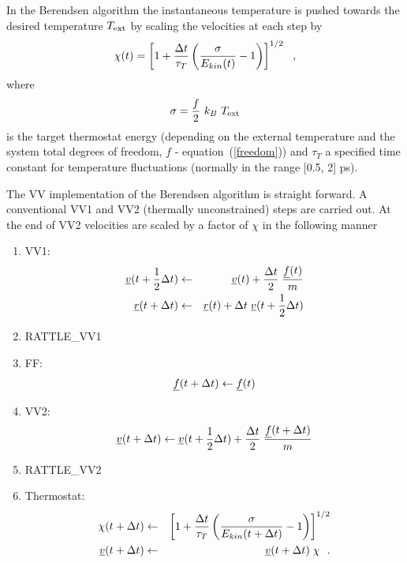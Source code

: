 In the Berendsen algorithm the instantaneous temperature is pushed
towards the desired temperature $T_{\rm ext}$ by scaling the
velocities at each step by
\begin{equation}
\chi (t) = \left[ 1 + {\Delta t \over \tau_{T}} \left(
{\sigma \over E_{kin}(t)} - 1 \right) \right]^{1/2}~~,
\end{equation}
where
\begin{equation}
\sigma = \frac{f}{2}~k_{B}~T_{\rm ext} \label{sigma}
\end{equation}
is the target thermostat energy (depending on the external
temperature and the system total degrees of freedom, $f$ -
equation~(\ref{freedom})) and $\tau_{T}$ a specified time constant
for temperature fluctuations (normally in the range [0.5, 2] ps).

The VV implementation of the Berendsen algorithm is straight forward.
A conventional VV1 and VV2 (thermally unconstrained) steps are
carried out.  At the end of VV2 velocities are scaled by a factor
of $\chi$ in the following manner
\begin{enumerate}
\item VV1:
\begin{eqnarray}
\mbox{$\underline{v}$}(t + {1 \over 2} \Delta t) &\leftarrow& \mbox{$\underline{v}$}(t) +
{\Delta t \over 2} \; {\mbox{$\underline{f}$}(t) \over m} \nonumber \\
\mbox{$\underline{r}$}(t + \Delta t) &\leftarrow& \mbox{$\underline{r}$}(t) + \Delta t \;
\mbox{$\underline{v}$}(t + {1 \over 2} \Delta t)
\end{eqnarray}
\item RATTLE\_VV1
\item FF:
\begin{equation}
\mbox{$\underline{f}$}(t + \Delta t) \leftarrow \mbox{$\underline{f}$}(t)
\end{equation}
\item VV2:
\begin{equation}
\mbox{$\underline{v}$}(t + \Delta t) \leftarrow \mbox{$\underline{v}$}(t + {1 \over 2} \Delta t) +
{\Delta t \over 2} \; {\mbox{$\underline{f}$}(t + \Delta t) \over m}
\end{equation}
\item RATTLE\_VV2
\item Thermostat:
\begin{eqnarray}
\chi (t + \Delta t) &\leftarrow& \left[ 1 + {\Delta t \over \tau_{T}}
\left( {\sigma \over E_{kin}(t + \Delta t)} - 1 \right) \right]^{1/2} \nonumber \\
\mbox{$\underline{v}$}(t + \Delta t) &\leftarrow& \mbox{$\underline{v}$}(t + \Delta t) \; \chi~~.
\end{eqnarray}
\end{enumerate}

